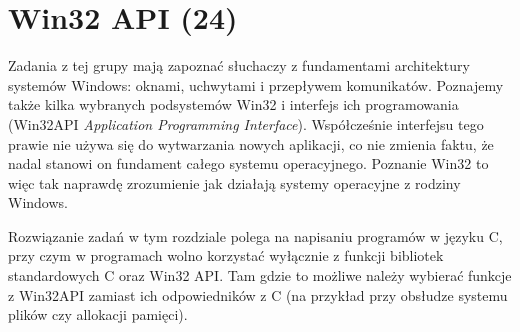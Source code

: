 ﻿\chapter{Win32 API (24)}

Zadania z tej grupy mają zapoznać słuchaczy z fundamentami architektury systemów Windows: oknami, uchwytami i przepływem komunikatów.
Poznajemy także kilka wybranych podsystemów Win32 i interfejs ich programowania (Win32API {\em Application Programming Interface}). 
Współcześnie interfejsu tego prawie nie używa się do wytwarzania nowych aplikacji, co nie zmienia faktu, że nadal stanowi on fundament całego systemu operacyjnego.
Poznanie Win32 to więc tak naprawdę zrozumienie jak działają systemy operacyjne z rodziny Windows.

Rozwiązanie zadań w tym rozdziale polega na napisaniu programów w
języku C, przy czym w programach wolno korzystać wyłącznie z funkcji bibliotek standardowych
C oraz Win32 API. Tam gdzie to możliwe należy wybierać funkcje z Win32API zamiast ich odpowiedników
z C (na przykład przy obsłudze systemu plików czy allokacji pamięci). 





